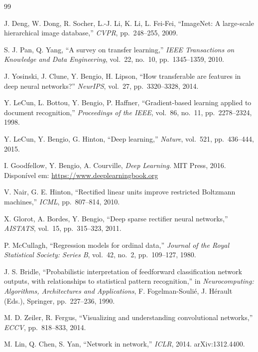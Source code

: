\documentclass[12pt,a4paper]{article}
\begin{document}
\begin{thebibliography}{99}

J. Deng, W. Dong, R. Socher, L.-J. Li, K. Li, L. Fei-Fei,
``ImageNet: A large-scale hierarchical image database,''
\emph{CVPR}, pp.~248--255, 2009.

S. J. Pan, Q. Yang,
``A survey on transfer learning,''
\emph{IEEE Transactions on Knowledge and Data Engineering},
vol.~22, no.~10, pp.~1345--1359, 2010.

J. Yosinski, J. Clune, Y. Bengio, H. Lipson,
``How transferable are features in deep neural networks?''
\emph{NeurIPS}, vol.~27, pp.~3320--3328, 2014.

Y. LeCun, L. Bottou, Y. Bengio, P. Haffner,
``Gradient-based learning applied to document recognition,''
\emph{Proceedings of the IEEE}, vol.~86, no.~11, pp.~2278--2324, 1998.

Y. LeCun, Y. Bengio, G. Hinton,
``Deep learning,''
\emph{Nature}, vol.~521, pp.~436--444, 2015.

I. Goodfellow, Y. Bengio, A. Courville,
\emph{Deep Learning}.
MIT Press, 2016. Disponível em: \url{https://www.deeplearningbook.org}

V. Nair, G. E. Hinton,
``Rectified linear units improve restricted Boltzmann machines,''
\emph{ICML}, pp.~807--814, 2010.

X. Glorot, A. Bordes, Y. Bengio,
``Deep sparse rectifier neural networks,''
\emph{AISTATS}, vol.~15, pp.~315--323, 2011.

P. McCullagh,
``Regression models for ordinal data,''
\emph{Journal of the Royal Statistical Society: Series B},
vol.~42, no.~2, pp.~109--127, 1980.

J. S. Bridle,
``Probabilistic interpretation of feedforward classification network
outputs, with relationships to statistical pattern recognition,''
in \emph{Neurocomputing: Algorithms, Architectures and Applications},
F. Fogelman-Soulié, J. Hérault (Eds.), Springer, pp.~227--236, 1990.

M. D. Zeiler, R. Fergus,
``Visualizing and understanding convolutional networks,''
\emph{ECCV}, pp.~818--833, 2014.

M. Lin, Q. Chen, S. Yan,
``Network in network,''
\emph{ICLR}, 2014. arXiv:1312.4400.


\end{thebibliography}
\end{document}
